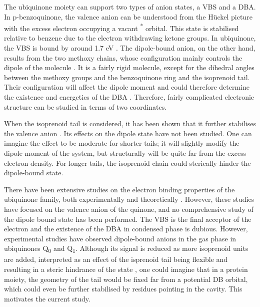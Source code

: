 The ubiquinone moiety can support two types of anion states, a VBS and a DBA. In p-benzoquinone, the valence anion can be understood from the H{\"u}ckel picture with the excess electron occupying a vacant \textpi \textsuperscript{*} orbital. This state is stabilised relative to benzene due to the electron withdrawing ketone groups. In ubiquinone, the VBS is bound by around 1.7 eV \cite{chen2024low}. The dipole-bound anion, on the other hand, results from the two methoxy chains, whose configuration mainly controls the dipole of the molecule \cite{ameixa2023parent}. It is a fairly rigid molecule, except for the dihedral angles between the methoxy groups and the benzoquinone ring and the isoprenoid tail. Their configuration will affect the dipole moment and could therefore determine the existence and energetics of the DBA \cite{ameixa2023parent,bull2015anion}. Therefore, fairly complicated electronic structure can be studied in terms of two coordinates. 

When the isoprenoid tail is considered, it has been shown that it further stabilises the valence anion \cite{pshenichnyuk2020ionizing}. Its effects on the dipole state have not been studied. One can imagine the effect to be moderate for shorter tails; it will slightly modify the dipole moment of the system, but structurally will be quite far from the excess electron density. For longer tails, the isoprenoid chain could sterically hinder the dipole-bound state.

There have been extensive studies on the electron binding properties of the ubiquinone family, both experimentally \cite{ameixa2023parent,west2014anion,pshenichnyuk2020ionizing,bull2015anion} and theoretically \cite{ameixa2023parent,pshenichnyuk2020ionizing,haldar2020multilayer, nonella1998quantum, gamiz2017terminal}. However, these studies have focused on the valence anion of the quinone, and no comprehensive study of the dipole bound state has been performed. The VBS is the final acceptor of the electron and the existence of the DBA in condensed phase is dubious.
However, experimental studies have observed dipole-bound anions in the gas phase in ubiquinones Q\textsubscript{0} and Q\textsubscript{1}\cite{ameixa2023parent}. Although its signal is reduced as more isoprenoid units are added, interpreted as an effect of the isprenoid tail being flexible and resulting in a steric hindrance of the state \cite{ameixa2023parent,pshenichnyuk2020ionizing}, one could imagine that in a protein moiety, the geometry of the tail would be fixed far from a potential DB orbital, which could even be further stabilised by residues pointing in the cavity. This motivates the current study.

